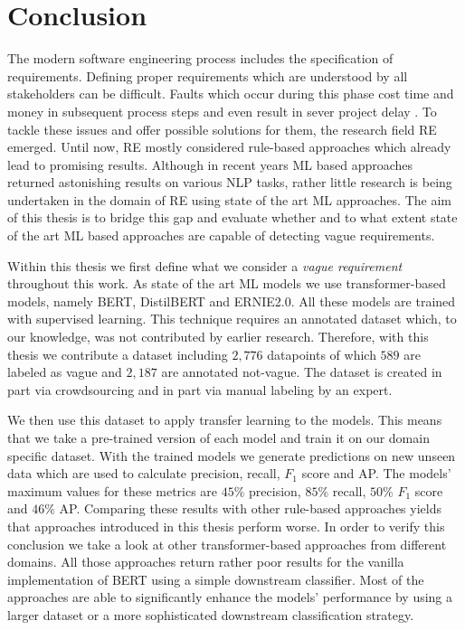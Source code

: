 \chapter{Conclusion}
\label{chp:conclusion}
The modern software engineering process includes the specification of requirements.
Defining proper requirements which are understood by all stakeholders can be difficult.
Faults which occur during this phase cost time and money in subsequent process steps \parencite{Mendez:2016} and even result in sever project delay \parencite{Femmer:2014}.
To tackle these issues and offer possible solutions for them, the research field \ac{RE} emerged.
Until now, \ac{RE} mostly considered rule-based approaches which already lead to promising results.
Although in recent years \ac{ML} based approaches returned astonishing results on various \ac{NLP} tasks, rather little research is being undertaken in the domain of \ac{RE} using state of the art \ac{ML} approaches.
The aim of this thesis is to bridge this gap and evaluate whether and to what extent state of the art \ac{ML} based approaches are capable of detecting vague requirements.

Within this thesis we first define what we consider a \textit{vague requirement} throughout this work.
As state of the art \ac{ML} models we use transformer-based models, namely \ac{BERT}, \ac{DistilBERT} and \ac{ERNIE2.0}.
All these models are trained with supervised learning.
This technique requires an annotated dataset which, to our knowledge, was not contributed by earlier research.
Therefore, with this thesis we contribute a dataset including $2,776$ datapoints of which $589$ are labeled as vague and $2,187$ are annotated not-vague.
The dataset is created in part via crowdsourcing and in part via manual labeling by an expert.

We then use this dataset to apply transfer learning to the models.
This means that we take a pre-trained version of each model and train it on our domain specific dataset.
With the trained models we generate predictions on new unseen data which are used to calculate precision, recall, $F_1$ score and \ac{AP}.
The models' maximum values for these metrics are $45\%$ precision, $85\%$ recall, $50\%$ $F_1$ score and $46\%$ \ac{AP}.
Comparing these results with other rule-based approaches yields that approaches introduced in this thesis perform worse.
In order to verify this conclusion we take a look at other transformer-based approaches from different domains.
All those approaches return rather poor results for the vanilla implementation of \ac{BERT} using a simple downstream classifier.
Most of the approaches are able to significantly enhance the models' performance by using a larger dataset or a more sophisticated downstream classification strategy.

